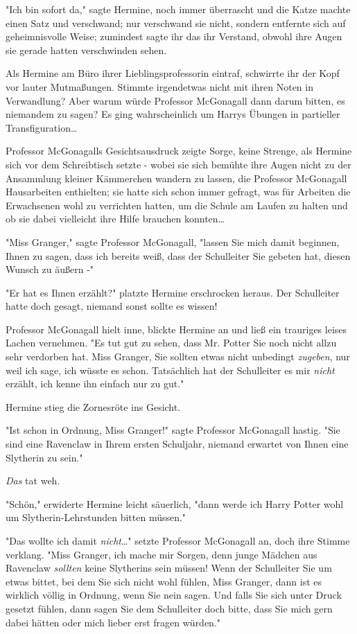 {"Ich bin sofort da," sagte Hermine, noch immer überrascht und die Katze machte einen Satz und verschwand; nur verschwand sie nicht, sondern entfernte sich auf geheimnisvolle Weise; zumindest sagte ihr das ihr Verstand, obwohl ihre Augen sie gerade hatten verschwinden sehen.

Als Hermine am Büro ihrer Lieblingsprofessorin eintraf, schwirrte ihr der Kopf vor lauter Mutmaßungen. Stimmte irgendetwas nicht mit ihren Noten in Verwandlung? Aber warum würde Professor McGonagall dann darum bitten, es niemandem zu sagen? Es ging wahrscheinlich um Harrys Übungen in partieller Transfiguration…

Professor McGonagalls Gesichtsausdruck zeigte Sorge, keine Strenge, als Hermine sich vor dem Schreibtisch setzte - wobei sie sich bemühte ihre Augen nicht zu der Ansammlung kleiner Kämmerchen wandern zu lassen, die Professor McGonagall Hausarbeiten enthielten; sie hatte sich schon immer gefragt, was für Arbeiten die Erwachsenen wohl zu verrichten hatten, um die Schule am Laufen zu halten und ob sie dabei vielleicht ihre Hilfe brauchen konnten…

"Miss Granger," sagte Professor McGonagall, "lassen Sie mich damit beginnen, Ihnen zu sagen, dass ich bereits weiß, dass der Schulleiter Sie gebeten hat, diesen Wunsch zu äußern -"

"Er hat es Ihnen erzählt?" platzte Hermine erschrocken heraus. Der Schulleiter hatte doch gesagt, niemand sonst sollte es wissen!

Professor McGonagall hielt inne, blickte Hermine an und ließ ein trauriges leises Lachen vernehmen. "Es tut gut zu sehen, dass Mr. Potter Sie noch nicht allzu sehr verdorben hat. Miss Granger, Sie sollten etwas nicht unbedingt \emph{zugeben}, nur weil ich sage, ich wüsste es schon. Tatsächlich hat der Schulleiter es mir \emph{nicht} erzählt, ich kenne ihn einfach nur zu gut."

Hermine stieg die Zornesröte ins Gesicht.

"Ist schon in Ordnung, Miss Granger!" sagte Professor McGonagall hastig. "Sie sind eine Ravenclaw in Ihrem ersten Schuljahr, niemand erwartet von Ihnen eine Slytherin zu sein."

\emph{Das} tat weh.

"Schön," erwiderte Hermine leicht säuerlich, "dann werde ich Harry Potter wohl um Slytherin-Lehrstunden bitten müssen."

"Das wollte ich damit \emph{nicht}…" setzte Professor McGonagall an, doch ihre Stimme verklang. "Miss Granger, ich mache mir Sorgen, denn junge Mädchen aus Ravenclaw \emph{sollten} keine Slytherins sein müssen! Wenn der Schulleiter Sie um etwas bittet, bei dem Sie sich nicht wohl fühlen, Miss Granger, dann ist es wirklich völlig in Ordnung, wenn Sie nein sagen. Und falls Sie sich unter Druck gesetzt fühlen, dann sagen Sie dem Schulleiter doch bitte, dass Sie mich gern dabei hätten oder mich lieber erst fragen würden."

}
